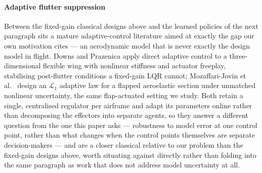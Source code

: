 \documentclass[preprint,11pt,authoryear]{elsarticle}
\begin{document}
\paragraph{Adaptive flutter suppression}
Between the fixed-gain classical designs above and the learned policies of the
next paragraph sits a mature adaptive-control literature aimed at exactly the
gap our own motivation cites --- an aerodynamic model that is never exactly the
design model in flight. Downs and Prazenica \citep{downs2023adaptive} apply
direct adaptive control to a three-dimensional flexible wing with nonlinear
stiffness and actuator freeplay, stabilising post-flutter conditions a
fixed-gain LQR cannot; Mozaffari-Jovin et al.\ \citep{mozaffarijovin2024l1}
design an $\mathcal L_1$ adaptive law for a flapped aeroelastic section under
unmatched nonlinear uncertainty, the same flap-actuated setting we study.
Both retain a single, centralised regulator per airframe and adapt its
parameters online rather than decomposing the effectors into separate agents,
so they answer a different question from the one this paper asks --- robustness
to model error at one control point, rather than what changes when the control
points themselves are separate decision-makers --- and are a closer classical
relative to our problem than the fixed-gain designs above, worth situating
against directly rather than folding into the same paragraph as work that
does not address model uncertainty at all.
\end{document}

